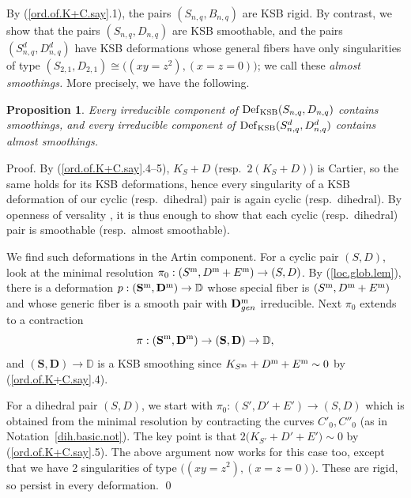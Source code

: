 \documentclass{amsart}
\newtheorem{prop}[thm]{Proposition}
\theoremstyle{definition}
\theoremstyle{remark}
\newcommand{\dd}[0]{{\mathbb D}}
\newcommand{\defsp}[0]{\operatorname{Def}}
\begin{document}
By (\ref{ord.of.K+C.say}.1), the pairs  $(S_{n,q}, B_{n,q})$ are KSB rigid. By contrast, we show that the pairs  $(S_{n,q}, D_{n,q})$ are KSB smoothable, and the pairs 
$(S^d_{n,q}, D^d_{n,q})$ have KSB deformations whose general fibers have only
singularities of type 
$(S_{2,1}, D_{2,1})\cong  \bigl((xy=z^2), (x=z=0)\bigr)$; we call these
{\it almost smoothings.} More precisely, we have the following.

\begin{prop} \label{smoothing.prop}
  Every irreducible component of
  $\defsp_{\rm KSB} (S_{n,q}, D_{n,q})$ contains smoothings, and 
every irreducible component of
   $\defsp_{\rm KSB} (S^d_{n,q}, D^d_{n,q})$ contains almost smoothings.
\end{prop}



Proof.   By (\ref{ord.of.K+C.say}.4--5),  $K_S+D$ (resp.\ $2(K_S+D)$)  is Cartier, so the same holds for its KSB deformations, hence every singularity of a KSB deformation of our cyclic (resp.\ dihedral) pair is again   cyclic (resp.\ dihedral). By openness of versality
\cite{art-bri}, it is thus enough to show that each  cyclic (resp.\ dihedral) pair is smoothable  (resp.\ almost smoothable).

We find such deformations in the Artin component.
For a cyclic pair $(S, D)$, 
 look at the minimal resolution  
  $\pi_0:(S^{\rm m}, D^{\rm m}+E^{\rm m})\to (S, D)$. By (\ref{loc.glob.lem}),
 there is a deformation  $p: ({\mathbf S}^{\rm m}, {\mathbf D}^{\rm m})\to \dd$
 whose special fiber is $(S^{\rm m}, D^{\rm m}+E^{\rm m})$ and whose generic fiber is a smooth pair with ${\mathbf D}^{\rm m}_{gen}$ irreducible.
 Next $\pi_0$ extends to a contraction
 $$
 \pi:({\mathbf S}^{\rm m}, {\mathbf D}^{\rm m})\to
 ({\mathbf S}, {\mathbf D})\to \dd,
 $$
and $({\mathbf S}, {\mathbf D})\to \dd$ is a KSB smoothing
 since $K_{S^{\rm m}}+ D^{\rm m}+E^{\rm m}\sim 0$  by (\ref{ord.of.K+C.say}.4).


 For a dihedral pair $(S, D)$,  we start with
 $\pi_0:(S', D'+E')\to (S, D)$ which is obtained from the
 minimal resolution by contracting the curves  $C'_0, C''_0$  (as in Notation~\ref{dih.basic.not}).
  The key point is that $2\bigl(K_{S'}+ D'+E'\bigr)\sim 0$
  by (\ref{ord.of.K+C.say}.5).
  The above argument now works for this case too, except that we have 2 singularities of type
 $\bigl((xy=z^2), (x=z=0)\bigr)$. These are rigid, so persist in every deformation. 
\qed
\end{document}

